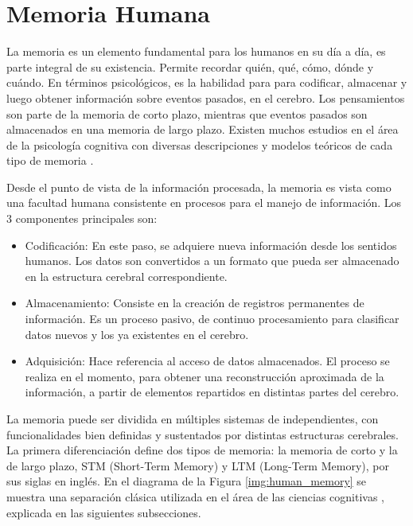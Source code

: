 
\section{Memoria Humana}


La memoria es un elemento fundamental para los humanos en su día a día, es parte integral de su existencia. Permite recordar quién, qué, cómo, dónde y cuándo. En términos psicológicos, es la habilidad para para codificar, almacenar y luego obtener información sobre eventos pasados, en el cerebro. Los pensamientos son parte de la memoria de corto plazo, mientras que eventos pasados son almacenados en una memoria de largo plazo. Existen muchos estudios en el área de la psicología cognitiva con diversas descripciones y modelos teóricos de cada tipo de memoria \cite{Vijayakumar2014}.

Desde el punto de vista de la información procesada, la memoria es vista como una facultad humana consistente en procesos para el manejo de información. Los 3 componentes principales son:

\begin{itemize}[topsep=0pt]
\setlength\itemsep{0.2em}
\item Codificación: En este paso, se adquiere nueva información desde los sentidos humanos. Los datos son convertidos a un formato que pueda ser almacenado en la estructura cerebral correspondiente.
\item Almacenamiento: Consiste en la creación de registros permanentes de información. Es un proceso pasivo, de continuo procesamiento para clasificar datos nuevos y los ya existentes en el cerebro.
\item Adquisición: Hace referencia al acceso de datos almacenados. El proceso se realiza en el momento, para obtener una reconstrucción aproximada de la información, a partir de elementos repartidos en distintas partes del cerebro.
\end{itemize}


La memoria puede ser dividida en múltiples sistemas de independientes, con funcionalidades bien definidas y sustentados por distintas estructuras cerebrales. La primera diferenciación define dos tipos de memoria: la memoria de corto y la de largo plazo, STM (Short-Term Memory) y LTM (Long-Term Memory), por sus siglas en inglés. En el diagrama de la Figura \ref{img:human_memory} se muestra una separación clásica utilizada en el área de las ciencias cognitivas \cite{Eichenbaum:2008}, explicada en las siguientes subsecciones.

